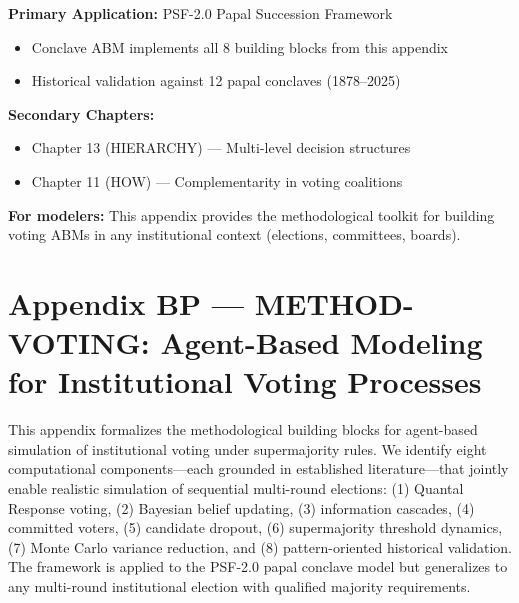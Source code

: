 
\begin{tcolorbox}[colback=purple!5!white, colframe=purple!75!black, title=Chapter Linkage]
\textbf{Primary Application:} PSF-2.0 Papal Succession Framework
\begin{itemize}[nosep]
\item Conclave ABM implements all 8 building blocks from this appendix
\item Historical validation against 12 papal conclaves (1878--2025)
\end{itemize}

\textbf{Secondary Chapters:}
\begin{itemize}[nosep]
\item Chapter 13 (HIERARCHY) --- Multi-level decision structures
\item Chapter 11 (HOW) --- Complementarity in voting coalitions
\end{itemize}

\textbf{For modelers:} This appendix provides the methodological toolkit for building
voting ABMs in any institutional context (elections, committees, boards).
\end{tcolorbox}


\chapter{Appendix BP --- METHOD-VOTING: Agent-Based Modeling for Institutional Voting Processes}
\label{app:bp}


\begin{tcolorbox}[colback=gray!5!white, colframe=gray!75!black, title=Abstract]
This appendix formalizes the methodological building blocks for agent-based
simulation of institutional voting under supermajority rules. We identify eight
computational components---each grounded in established literature---that jointly
enable realistic simulation of sequential multi-round elections: (1) Quantal
Response voting, (2) Bayesian belief updating, (3) information cascades,
(4) committed voters, (5) candidate dropout, (6) supermajority threshold dynamics,
(7) Monte Carlo variance reduction, and (8) pattern-oriented historical validation.
The framework is applied to the PSF-2.0 papal conclave model but generalizes to
any multi-round institutional election with qualified majority requirements.
\end{tcolorbox}

